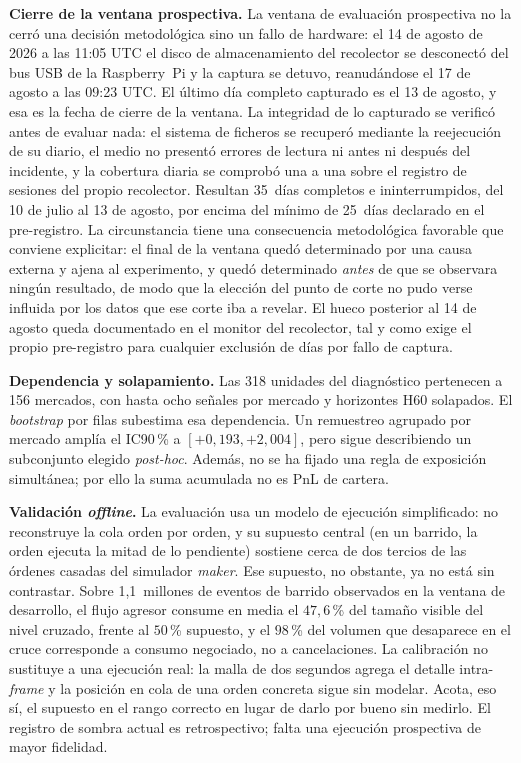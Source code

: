 \textbf{Cierre de la ventana prospectiva.} La ventana de evaluación prospectiva no la
cerró una decisión metodológica sino un fallo de hardware: el 14 de agosto de 2026 a las
11:05 UTC el disco de almacenamiento del recolector se desconectó del bus USB de la
Raspberry~Pi y la captura se detuvo, reanudándose el 17 de agosto a las 09:23 UTC. El
último día completo capturado es el 13 de agosto, y esa es la fecha de cierre de la
ventana. La integridad de lo capturado se verificó antes de evaluar nada: el sistema de
ficheros se recuperó mediante la reejecución de su diario, el medio no presentó errores
de lectura ni antes ni después del incidente, y la cobertura diaria se comprobó una a una
sobre el registro de sesiones del propio recolector. Resultan 35~días completos e
ininterrumpidos, del 10 de julio al 13 de agosto, por encima del mínimo de 25~días
declarado en el pre-registro. La circunstancia tiene una consecuencia metodológica
favorable que conviene explicitar: el final de la ventana quedó determinado por una causa
externa y ajena al experimento, y quedó determinado \emph{antes} de que se observara
ningún resultado, de modo que la elección del punto de corte no pudo verse influida por
los datos que ese corte iba a revelar. El hueco posterior al 14 de agosto queda
documentado en el monitor del recolector, tal y como exige el propio pre-registro para
cualquier exclusión de días por fallo de captura.

\textbf{Dependencia y solapamiento.} Las 318 unidades del diagnóstico pertenecen a 156
mercados, con hasta ocho señales por mercado y horizontes H60 solapados. El
\emph{bootstrap} por filas subestima esa dependencia. Un remuestreo agrupado por mercado
amplía el IC90\,\% a $[+0{,}193,+2{,}004]$, pero sigue describiendo un subconjunto elegido
\emph{post-hoc}. Además, no se ha fijado una regla de exposición simultánea; por ello la suma
acumulada no es PnL de cartera.

\textbf{Validación \emph{offline}.} La evaluación usa un modelo de ejecución simplificado:
no reconstruye la cola orden por orden, y su supuesto central (en un barrido, la orden
ejecuta la mitad de lo pendiente) sostiene cerca de dos tercios de las órdenes casadas
del simulador \emph{maker}. Ese supuesto, no obstante, ya no está sin contrastar. Sobre
1,1~millones de eventos de barrido observados en la ventana de desarrollo, el flujo
agresor consume en media el $47{,}6$\,\% del tamaño visible del nivel cruzado, frente al
$50$\,\% supuesto, y el $98$\,\% del volumen que desaparece en el cruce corresponde a
consumo negociado, no a cancelaciones. La calibración no sustituye a una ejecución real:
la malla de dos segundos agrega el detalle intra-\emph{frame} y la posición en cola de
una orden concreta sigue sin modelar. Acota, eso sí, el supuesto en el rango correcto en
lugar de darlo por bueno sin medirlo. El registro de sombra actual es retrospectivo; falta
una ejecución prospectiva de mayor fidelidad.

